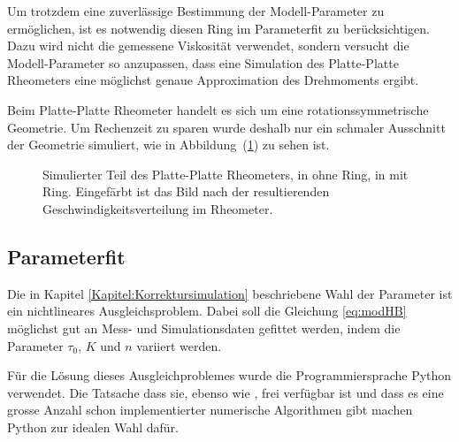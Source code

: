 Um trotzdem eine zuverlässige Bestimmung der Modell-Parameter zu ermöglichen, ist es notwendig diesen Ring im Parameterfit zu berücksichtigen. Dazu wird nicht die gemessene Viskosität verwendet, sondern versucht die Modell-Parameter so anzupassen, dass eine Simulation des Platte-Platte Rheometers eine möglichst genaue Approximation des Drehmoments ergibt.

Beim Platte-Platte Rheometer handelt es sich um eine rotationssymmetrische Geometrie. Um Rechenzeit zu sparen wurde deshalb nur ein schmaler Ausschnitt der Geometrie simuliert, wie in Abbildung~(\ref{fig:plattePlatteRheoSim}) zu sehen ist.\\
\begin{figure}
\centering
{}
\caption{Simulierter Teil des Platte-Platte Rheometers, in  ohne Ring, in  mit Ring.
Eingefärbt ist das Bild nach der resultierenden Geschwindigkeitsverteilung im Rheometer.}
\label{fig:plattePlatteRheoSim}
\end{figure}
%
\subsection{Parameterfit}
Die in Kapitel \ref{Kapitel:Korrektursimulation} beschriebene Wahl der Parameter ist ein nichtlineares Ausgleichsproblem. Dabei soll die Gleichung \eqref{eq:modHB} möglichst gut an Mess- und Simulationsdaten gefittet werden, indem die Parameter $\tau_0$, $K$ und $n$ variiert werden.

Für die Lösung dieses Ausgleichproblemes wurde die Programmiersprache Python verwendet. Die Tatsache dass sie, ebenso wie \openfoam{}, frei verfügbar ist und dass es eine grosse Anzahl schon implementierter numerische Algorithmen gibt machen Python zur idealen Wahl dafür.


